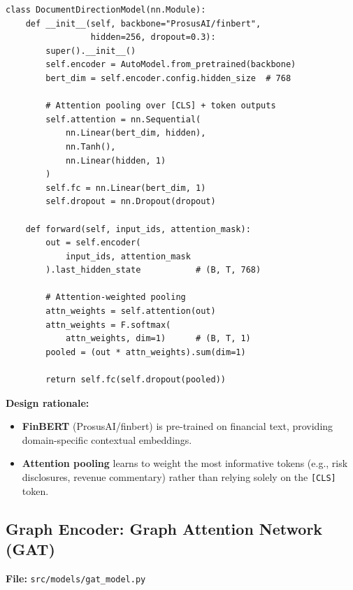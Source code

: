 \documentclass[12pt, a4paper]{article}
\begin{document}
\begin{lstlisting}[caption={Document direction model}]
class DocumentDirectionModel(nn.Module):
    def __init__(self, backbone="ProsusAI/finbert",
                 hidden=256, dropout=0.3):
        super().__init__()
        self.encoder = AutoModel.from_pretrained(backbone)
        bert_dim = self.encoder.config.hidden_size  # 768
        
        # Attention pooling over [CLS] + token outputs
        self.attention = nn.Sequential(
            nn.Linear(bert_dim, hidden),
            nn.Tanh(),
            nn.Linear(hidden, 1)
        )
        self.fc = nn.Linear(bert_dim, 1)
        self.dropout = nn.Dropout(dropout)
    
    def forward(self, input_ids, attention_mask):
        out = self.encoder(
            input_ids, attention_mask
        ).last_hidden_state           # (B, T, 768)
        
        # Attention-weighted pooling
        attn_weights = self.attention(out)
        attn_weights = F.softmax(
            attn_weights, dim=1)      # (B, T, 1)
        pooled = (out * attn_weights).sum(dim=1)
        
        return self.fc(self.dropout(pooled))
\end{lstlisting}

\textbf{Design rationale:}
\begin{itemize}[nosep]
    \item \textbf{FinBERT} (ProsusAI/finbert) is pre-trained on financial text, providing domain-specific contextual embeddings.
    \item \textbf{Attention pooling} learns to weight the most informative tokens (e.g., risk disclosures, revenue commentary) rather than relying solely on the \texttt{[CLS]} token.
\end{itemize}


\subsection{Graph Encoder: Graph Attention Network (GAT)}
\label{sec:gat-model}

\noindent\textbf{File:} \texttt{src/models/gat\_model.py}
\end{document}
